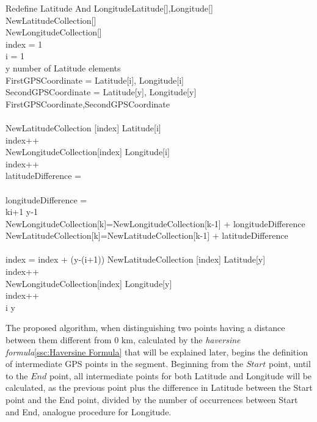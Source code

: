\documentclass[tesi]{subfiles}
\begin{document}
\begin{pseudocode}{Redefine Latitude And Longitude}{Latitude[],Longitude[]}
\label{alg:Redefine Latitude And Longitude}
\\
\BEGIN
NewLatitudeCollection[]\\
NewLongitudeCollection[]\\
index = 1\\ 
i = 1\\
\FOR y \TO number \thinspace of \thinspace
Latitude \thinspace elements \DO \\
\BEGIN
FirstGPSCoordinate = Latitude[i], Longitude[i]\\
SecondGPSCoordinate = Latitude[y], Longitude[y]\\
\IF {} {FirstGPSCoordinate,SecondGPSCoordinate}  \DO\\
\BEGIN
{}\\
NewLatitudeCollection [index] \GETS Latitude[i]\\
index++\\
NewLongitudeCollection[index] \GETS Longitude[i]\\
index++\\
latitudeDifference = \\\\
longitudeDifference = \\
\FOR k\GETS i+1 \TO y-1\DO \\
\BEGIN
NewLongitudeCollection[k]=NewLongitudeCollection[k-1] + longitudeDifference\\
NewLatitudeCollection[k]=NewLatitudeCollection[k-1] + latitudeDifference\\
\END \\
index = index + (y-(i+1))
NewLatitudeCollection [index] \GETS Latitude[y]\\
index++\\
NewLongitudeCollection[index] \GETS Longitude[y]\\
index++\\
i \GETS y\\ 
\END
\END
\END
\end{pseudocode} 	



The proposed algorithm, when distinguishing two points having a distance between them different from $0$ $\si{\km}$, calculated by the \textit{haversine formula}\ref{ssc:Haversine Formula} that will be explained later, begins the definition of intermediate GPS points in the segment.
Beginning from the $Start$ point, until to the $End$ point, all intermediate points for both Latitude and Longitude will be calculated, as the previous point plus the difference in Latitude between the Start point and the End point, divided by the number of occurrences between Start and End, analogue procedure for Longitude.
\end{document}
